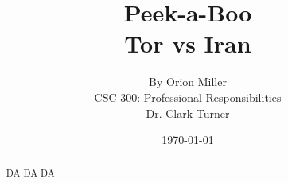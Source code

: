 \documentclass[11pt]{article}
\begin{document}
\title{\vfill Peek-a-Boo \\ \large Tor vs Iran}
\author{ 
  By Orion Miller\vspace{10pt} \\
  CSC 300: Professional Responsibilities \vspace{10pt} \\
  Dr. Clark Turner\vspace{10pt} \\
}
\date{\today}

\maketitle

\vfill  %
\begin{abstract} 
  DA DA DA
\end{abstract}

\thispagestyle{empty} %

\newpage

\thispagestyle{empty}  %

\tableofcontents

\newpage

\end{document}
